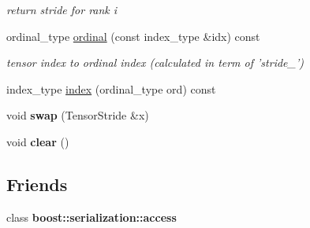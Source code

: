 \begin{DoxyCompactItemize}
\begin{DoxyCompactList}\small\item\em return stride for rank i \item\end{DoxyCompactList}\item 
\hypertarget{classbtas_1_1_tensor_stride_3_01_n_00_01_cblas_col_major_00_01_t__ext_00_01_t__str_00_01_t__idx_01_4_a65742841081556ab361d4507ba2949ee}{
ordinal\_\-type \hyperlink{classbtas_1_1_tensor_stride_3_01_n_00_01_cblas_col_major_00_01_t__ext_00_01_t__str_00_01_t__idx_01_4_a65742841081556ab361d4507ba2949ee}{ordinal} (const index\_\-type \&idx) const }
\label{classbtas_1_1_tensor_stride_3_01_n_00_01_cblas_col_major_00_01_t__ext_00_01_t__str_00_01_t__idx_01_4_a65742841081556ab361d4507ba2949ee}

\begin{DoxyCompactList}\small\item\em tensor index to ordinal index (calculated in term of 'stride\_\-') \item\end{DoxyCompactList}\item 
index\_\-type \hyperlink{classbtas_1_1_tensor_stride_3_01_n_00_01_cblas_col_major_00_01_t__ext_00_01_t__str_00_01_t__idx_01_4_ab8527a50a7a91639e8e5a9c3564f7c53}{index} (ordinal\_\-type ord) const 
\item 
\hypertarget{classbtas_1_1_tensor_stride_3_01_n_00_01_cblas_col_major_00_01_t__ext_00_01_t__str_00_01_t__idx_01_4_ae5733c30101a01b4457ba6757017b9fd}{
void {\bfseries swap} (TensorStride \&x)}
\label{classbtas_1_1_tensor_stride_3_01_n_00_01_cblas_col_major_00_01_t__ext_00_01_t__str_00_01_t__idx_01_4_ae5733c30101a01b4457ba6757017b9fd}

\item 
\hypertarget{classbtas_1_1_tensor_stride_3_01_n_00_01_cblas_col_major_00_01_t__ext_00_01_t__str_00_01_t__idx_01_4_ad8b361861eff55ae7938f99e823e2f18}{
void {\bfseries clear} ()}
\label{classbtas_1_1_tensor_stride_3_01_n_00_01_cblas_col_major_00_01_t__ext_00_01_t__str_00_01_t__idx_01_4_ad8b361861eff55ae7938f99e823e2f18}

\end{DoxyCompactItemize}
\subsection*{Friends}
\begin{DoxyCompactItemize}
\item 
\hypertarget{classbtas_1_1_tensor_stride_3_01_n_00_01_cblas_col_major_00_01_t__ext_00_01_t__str_00_01_t__idx_01_4_ac98d07dd8f7b70e16ccb9a01abf56b9c}{
class {\bfseries boost::serialization::access}}
\label{classbtas_1_1_tensor_stride_3_01_n_00_01_cblas_col_major_00_01_t__ext_00_01_t__str_00_01_t__idx_01_4_ac98d07dd8f7b70e16ccb9a01abf56b9c}

\end{DoxyCompactItemize}
